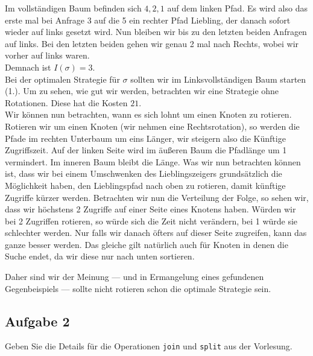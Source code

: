 \documentclass[11pt,a4paper,ngerman]{article}
\begin{document}
Im vollständigen Baum befinden sich $4,2,1$ auf dem linken Pfad. Es wird also das erste mal bei Anfrage $3$ auf die 5 ein rechter Pfad Liebling, der danach sofort wieder auf links gesetzt wird. Nun bleiben wir bis zu den letzten beiden Anfragen auf links. Bei den letzten beiden gehen wir genau 2 mal nach Rechts, wobei wir vorher auf links waren.\\

Demnach ist $I(\sigma) = 3$.\\

Bei der optimalen Strategie für $\sigma$ sollten wir im Linksvollständigen Baum starten (1.). Um zu sehen, wie gut wir werden,
betrachten wir eine Strategie ohne Rotationen. Diese hat die Kosten $21$.\\

Wir können nun betrachten, wann es sich lohnt um einen Knoten zu rotieren. Rotieren
wir um einen Knoten (wir nehmen eine Rechtsrotation), so werden die Pfade im rechten Unterbaum um eins Länger, wir steigern also die Künftige Zugriffszeit. Auf der linken Seite wird im äußeren Baum die Pfadlänge um 1 vermindert. Im inneren Baum bleibt die Länge. Was wir nun betrachten können ist, dass wir bei einem Umschwenken des Lieblingszeigers grundsätzlich die Möglichkeit haben, den Lieblingspfad nach oben zu rotieren, damit künftige Zugriffe kürzer werden. Betrachten wir nun die Verteilung der Folge, so sehen wir, dass wir höchstens 2 Zugriffe auf einer Seite eines Knotens haben. Würden wir bei 2 Zugriffen rotieren, so würde sich die Zeit nicht verändern, bei 1 würde sie schlechter werden. Nur falls wir danach öfters auf dieser Seite zugreifen, kann das ganze besser werden. Das gleiche gilt natürlich auch für Knoten in denen die Suche endet, da wir diese nur nach unten sortieren.

Daher sind wir der Meinung --- und in Ermangelung eines gefundenen Gegenbeispiels --- sollte nicht rotieren schon die optimale Strategie sein.
\subsection*{Aufgabe 2}

Geben Sie die Details für die Operationen \lstinline|join| und \lstinline|split| aus der Vorlesung.
\end{document}
